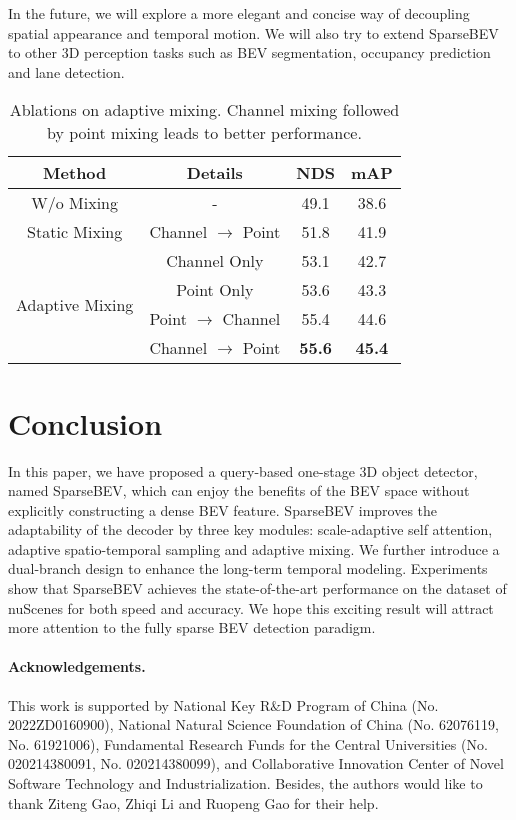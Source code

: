 \documentclass[10pt,twocolumn,letterpaper]{article}
\begin{document}
In the future, we will explore a more elegant and concise way of decoupling spatial appearance and temporal motion. We will also try to extend SparseBEV to other 3D perception tasks such as BEV segmentation, occupancy prediction and lane detection.

\begin{table}[t]
  \centering
  \begin{tabular}{c|c|cc}
    \toprule
    Method & Details & NDS & mAP \\
    \midrule
    W/o Mixing & - & 49.1 & 38.6 \\
    Static Mixing & Channel $\rightarrow$ Point & 51.8 & 41.9 \\
    \midrule
    \multirow{4}{*}{Adaptive Mixing} & Channel Only & 53.1 & 42.7 \\
    & Point Only & 53.6 & 43.3 \\
    & Point $\rightarrow$ Channel & 55.4 & 44.6 \\
    & Channel $\rightarrow$ Point & \textbf{55.6} & \textbf{45.4} \\
    \bottomrule
  \end{tabular}
  \caption{Ablations on adaptive mixing. Channel mixing followed by point mixing leads to better performance.}
  \label{table:mixing}
  \vspace{-6pt}
\end{table}

\section{Conclusion}

In this paper, we have proposed a query-based one-stage 3D object detector, named SparseBEV, which can enjoy the benefits of the BEV space without explicitly constructing a dense BEV feature. SparseBEV improves the adaptability of the decoder by three key modules: scale-adaptive self attention, adaptive spatio-temporal sampling and adaptive mixing. We further introduce a dual-branch design to enhance the long-term temporal modeling. Experiments show that SparseBEV achieves the state-of-the-art performance on the dataset of nuScenes for both speed and accuracy. We hope this exciting result will attract more attention to the fully sparse BEV detection paradigm.

\paragraph{Acknowledgements.} This work is supported by National Key R$\&$D Program of China (No. 2022ZD0160900), National Natural Science Foundation of China (No. 62076119, No. 61921006), Fundamental Research Funds for the Central Universities (No. 020214380091, No. 020214380099), and Collaborative Innovation Center of Novel Software Technology and Industrialization. Besides, the authors would like to thank Ziteng Gao, Zhiqi Li and Ruopeng Gao for their help.
\end{document}
